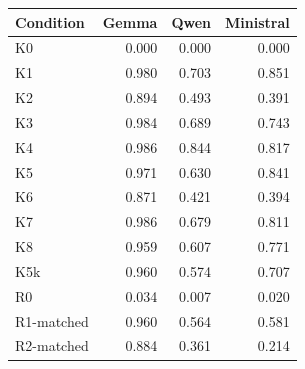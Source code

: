 \begin{tabular}{lrrr}
\toprule
Condition & Gemma & Qwen & Ministral \\
\midrule
K0 & 0.000 & 0.000 & 0.000 \\
K1 & 0.980 & 0.703 & 0.851 \\
K2 & 0.894 & 0.493 & 0.391 \\
K3 & 0.984 & 0.689 & 0.743 \\
K4 & 0.986 & 0.844 & 0.817 \\
K5 & 0.971 & 0.630 & 0.841 \\
K6 & 0.871 & 0.421 & 0.394 \\
K7 & 0.986 & 0.679 & 0.811 \\
K8 & 0.959 & 0.607 & 0.771 \\
K5k & 0.960 & 0.574 & 0.707 \\
R0 & 0.034 & 0.007 & 0.020 \\
R1-matched & 0.960 & 0.564 & 0.581 \\
R2-matched & 0.884 & 0.361 & 0.214 \\
\bottomrule
\end{tabular}
